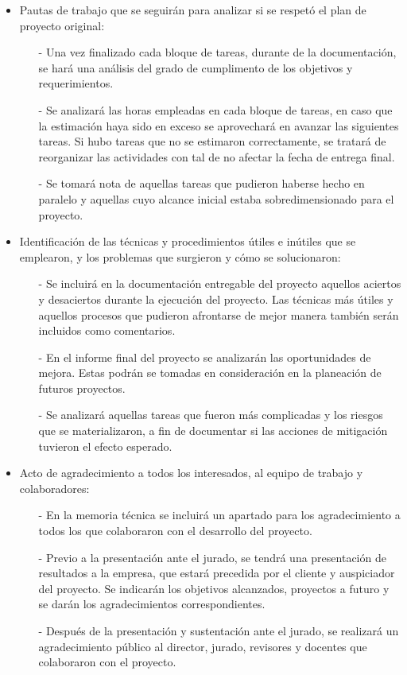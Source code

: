 \documentclass[
11pt, %
]{charter}
\begin{document}
\begin{itemize}
	\item Pautas de trabajo que se seguirán para analizar si se respetó el plan de proyecto original:
	 \begin{itemize}
	 \item[-]Una vez finalizado cada bloque de tareas, durante de la documentación, se hará una análisis del grado de cumplimento de los objetivos y requerimientos.
	 \item[-]Se analizará las horas empleadas en cada bloque de tareas, en caso que la estimación haya sido en exceso se aprovechará en avanzar las siguientes tareas. Si hubo tareas que no se estimaron correctamente, se tratará de reorganizar las actividades con tal de no afectar la fecha de entrega final.
	 \item[-]Se tomará nota de aquellas tareas que pudieron haberse hecho en paralelo y aquellas cuyo alcance inicial estaba sobredimensionado para el proyecto.
	 \end{itemize} 
	\item Identificación de las técnicas y procedimientos útiles e inútiles que se emplearon, y los problemas que surgieron y cómo se solucionaron:
	\begin{itemize}
	 \item[-]Se incluirá en la documentación entregable del proyecto aquellos aciertos y desaciertos durante la ejecución del proyecto. Las técnicas más útiles y aquellos procesos que pudieron afrontarse de mejor manera también serán incluidos como comentarios.
	 \item[-]En el informe final del proyecto se analizarán las oportunidades de mejora. Estas podrán se tomadas en consideración en la planeación de futuros proyectos.
	 \item[-] Se analizará aquellas tareas que fueron más complicadas y los riesgos que se materializaron, a fin de documentar si las acciones de mitigación tuvieron el efecto esperado.
	 \end{itemize} 
	\item Acto de agradecimiento a todos los interesados, al equipo de trabajo y colaboradores:
	\begin{itemize}
	\item[-]En la memoria técnica se incluirá un apartado para los agradecimiento a todos los que colaboraron con el desarrollo del proyecto.
	\item[-]Previo a la presentación ante el jurado, se tendrá una presentación de resultados a la empresa, que estará precedida por el cliente y auspiciador del proyecto. Se indicarán los objetivos alcanzados, proyectos a futuro y se darán los agradecimientos correspondientes.
	\item[-]Después de la presentación y sustentación ante el jurado, se realizará un agradecimiento público al director, jurado, revisores y docentes que colaboraron con el proyecto. 
	 \end{itemize}
\end{itemize}
\end{document}
